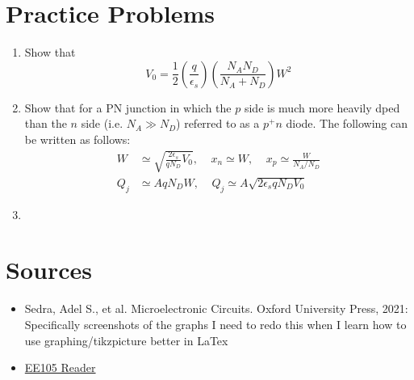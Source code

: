\section{Practice Problems}
\begin{enumerate}
    \item Show that 
        \[V_0 = \frac12 (\frac{q}{\epsilon_s})(\frac{N_A N_D}{N_A + N_D}) W^2\]
    \item Show that for a PN junction in which the $p$ side is much more heavily dped than the $n$ side (i.e. $N_A \gg N_D$) referred to as a $p^+ n$ diode. The following can be written as follows:
        \begin{align*}
            W &\simeq \sqrt{\frac{2 \epsilon_s}{q N_D}V_0}, ~~~~~ x_n \simeq W, ~~~~~ x_p \simeq \frac{W}{N_A / N_D} \\
            Q_j &\simeq A q N_D W, ~~~~~ Q_j \simeq A \sqrt{2 \epsilon_s q N_D V_0}
        \end{align*}
    
    \item 
\end{enumerate}

\section{Sources}
\begin{itemize}
    \item Sedra, Adel S., et al. Microelectronic Circuits. Oxford University Press, 2021: Specifically screenshots of the graphs I need to redo this when I learn how to use graphing/tikzpicture better in LaTex
    \item \href{https://file.notion.so/f/f/048d6522-202b-48d4-b5d9-bc005bd602e2/214bf1f0-292f-48d6-9016-737d9f5da155/ee105_reader_v3.pdf?id=237a4300-3dbe-47d1-888b-ffae90d8352b&table=block&spaceId=048d6522-202b-48d4-b5d9-bc005bd602e2&expirationTimestamp=1714435200000&signature=yx-H1qvZJIodPfazOpwXX0Ce2mWMG8skOHl45xoPxus&downloadName=ee105_reader_v3.pdf}{EE105 Reader}
\end{itemize}